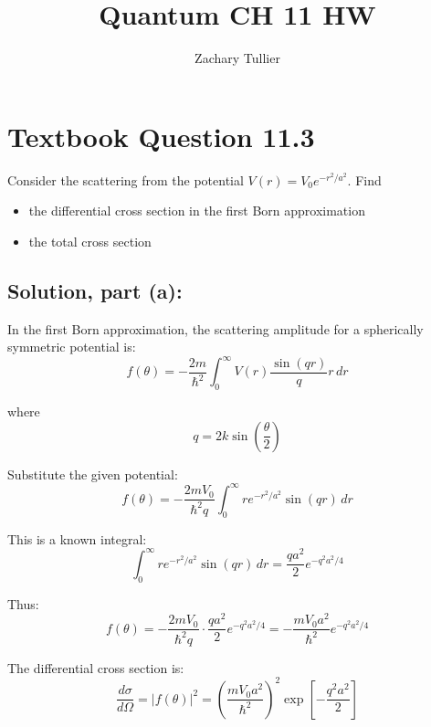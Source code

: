 \documentclass[12pt]{article}
\begin{document}
\singlespacing  %
\title{Quantum CH 11 HW}

\author[1]{Zachary Tullier}
\date{}
\maketitle

\section{Textbook Question 11.3}
    Consider the scattering from the potential \( V(r) = V_0 e^{-r^2/a^2} \). Find  
    \begin{itemize}
        \item [(a)] the differential cross section in the first Born approximation
        \item [(b)] the total cross section
    \end{itemize}

    \subsection{Solution, part (a):}
        In the first Born approximation, the scattering amplitude for a spherically symmetric potential is:
        \[
            f(\theta) = -\frac{2m}{\hbar^2} \int_0^\infty V(r) \frac{\sin(qr)}{q} r \, dr
        \]
        
        where 
        \[ 
            q = 2k \sin\left( \frac{\theta}{2} \right) 
        \]
        
        Substitute the given potential:
        \[
            f(\theta) = -\frac{2m V_0}{\hbar^2 q} \int_0^\infty r e^{-r^2/a^2} \sin(qr) \, dr
        \]
        
        This is a known integral:
        \[
            \int_0^\infty r e^{-r^2/a^2} \sin(qr) \, dr = \frac{q a^2}{2} e^{-q^2 a^2 / 4}
        \]
        
        Thus:
        \[
            f(\theta) = -\frac{2m V_0}{\hbar^2 q} \cdot \frac{q a^2}{2} e^{-q^2 a^2 / 4} = -\frac{m V_0 a^2}{\hbar^2} e^{-q^2 a^2 / 4}
        \]
        
        The differential cross section is:
        \[
            \boxed{
            \frac{d\sigma}{d\Omega} = \left| f(\theta) \right|^2 = \left( \frac{m V_0 a^2}{\hbar^2} \right)^2 \exp\left[ -\frac{q^2 a^2}{2} \right]}
        \]
        
\end{document}
